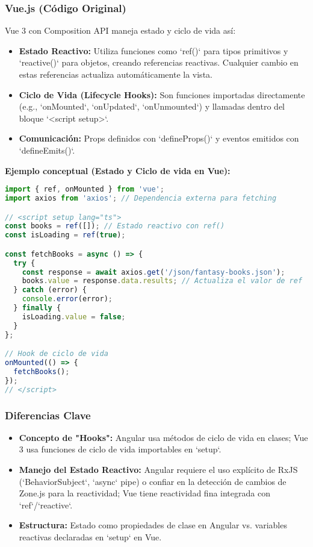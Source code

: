 \documentclass[11pt, a4paper]{article}
\begin{document}
\subsubsection{Vue.js (Código Original)}
Vue 3 con Composition API maneja estado y ciclo de vida así:
\begin{itemize}
    \item \textbf{Estado Reactivo:} Utiliza funciones como `ref()` para tipos primitivos y `reactive()` para objetos, creando referencias reactivas. Cualquier cambio en estas referencias actualiza automáticamente la vista.
    \item \textbf{Ciclo de Vida (Lifecycle Hooks):} Son funciones importadas directamente (e.g., `onMounted`, `onUpdated`, `onUnmounted`) y llamadas dentro del bloque `<script setup>`.
    \item \textbf{Comunicación:} Props definidos con `defineProps()` y eventos emitidos con `defineEmits()`.
\end{itemize}

\textbf{Ejemplo conceptual (Estado y Ciclo de vida en Vue):}
\begin{lstlisting}[language=JavaScript]
import { ref, onMounted } from 'vue';
import axios from 'axios'; // Dependencia externa para fetching

// <script setup lang="ts">
const books = ref([]); // Estado reactivo con ref()
const isLoading = ref(true);

const fetchBooks = async () => {
  try {
    const response = await axios.get('/json/fantasy-books.json');
    books.value = response.data.results; // Actualiza el valor de ref
  } catch (error) {
    console.error(error);
  } finally {
    isLoading.value = false;
  }
};

// Hook de ciclo de vida
onMounted(() => {
  fetchBooks();
});
// </script>
\end{lstlisting}

\subsubsection{Diferencias Clave}
\begin{itemize}
    \item \textbf{Concepto de "Hooks":} Angular usa métodos de ciclo de vida en clases; Vue 3 usa funciones de ciclo de vida importables en `setup`.
    \item \textbf{Manejo del Estado Reactivo:} Angular requiere el uso explícito de RxJS (`BehaviorSubject`, `async` pipe) o confiar en la detección de cambios de Zone.js para la reactividad; Vue tiene reactividad fina integrada con `ref`/`reactive`.
    \item \textbf{Estructura:} Estado como propiedades de clase en Angular vs. variables reactivas declaradas en `setup` en Vue.
\end{itemize}
\end{document}
